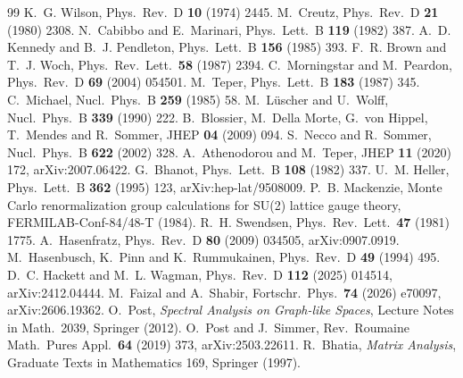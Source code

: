 \documentclass[11pt]{article}
\begin{document}
\begin{thebibliography}{99}
 K.~G. Wilson, Phys.\ Rev.\ D \textbf{10} (1974) 2445.
 M.~Creutz, Phys.\ Rev.\ D \textbf{21} (1980) 2308.
 N.~Cabibbo and E.~Marinari, Phys.\ Lett.\ B \textbf{119} (1982) 387.
 A.~D. Kennedy and B.~J. Pendleton, Phys.\ Lett.\ B \textbf{156} (1985) 393.
 F.~R. Brown and T.~J. Woch, Phys.\ Rev.\ Lett.\ \textbf{58} (1987) 2394.
 C.~Morningstar and M.~Peardon, Phys.\ Rev.\ D \textbf{69} (2004) 054501.
 M.~Teper, Phys.\ Lett.\ B \textbf{183} (1987) 345.
 C.~Michael, Nucl.\ Phys.\ B \textbf{259} (1985) 58.
 M.~L\"uscher and U.~Wolff, Nucl.\ Phys.\ B \textbf{339} (1990) 222.
 B.~Blossier, M.~Della Morte, G.~von Hippel, T.~Mendes and R.~Sommer, JHEP \textbf{04} (2009) 094.
 S.~Necco and R.~Sommer, Nucl.\ Phys.\ B \textbf{622} (2002) 328.
 A.~Athenodorou and M.~Teper, JHEP \textbf{11} (2020) 172, arXiv:2007.06422.
 G.~Bhanot, Phys.\ Lett.\ B \textbf{108} (1982) 337.
 U.~M. Heller, Phys.\ Lett.\ B \textbf{362} (1995) 123, arXiv:hep-lat/9508009.
 P.~B. Mackenzie, Monte Carlo renormalization group calculations for SU(2) lattice gauge theory, FERMILAB-Conf-84/48-T (1984).
 R.~H. Swendsen, Phys.\ Rev.\ Lett.\ \textbf{47} (1981) 1775.
 A.~Hasenfratz, Phys.\ Rev.\ D \textbf{80} (2009) 034505, arXiv:0907.0919.
 M.~Hasenbusch, K.~Pinn and K.~Rummukainen, Phys.\ Rev.\ D \textbf{49} (1994) 495.
 D.~C. Hackett and M.~L. Wagman, Phys.\ Rev.\ D \textbf{112} (2025) 014514, arXiv:2412.04444.
 M.~Faizal and A.~Shabir, Fortschr.\ Phys.\ \textbf{74} (2026) e70097, arXiv:2606.19362.
 O.~Post, \emph{Spectral Analysis on Graph-like Spaces}, Lecture Notes in Math.\ 2039, Springer (2012).
 O.~Post and J.~Simmer, Rev.\ Roumaine Math.\ Pures Appl.\ \textbf{64} (2019) 373,
arXiv:2503.22611.
 R.~Bhatia, \emph{Matrix Analysis}, Graduate Texts in Mathematics 169, Springer (1997).
\end{thebibliography}
\end{document}
